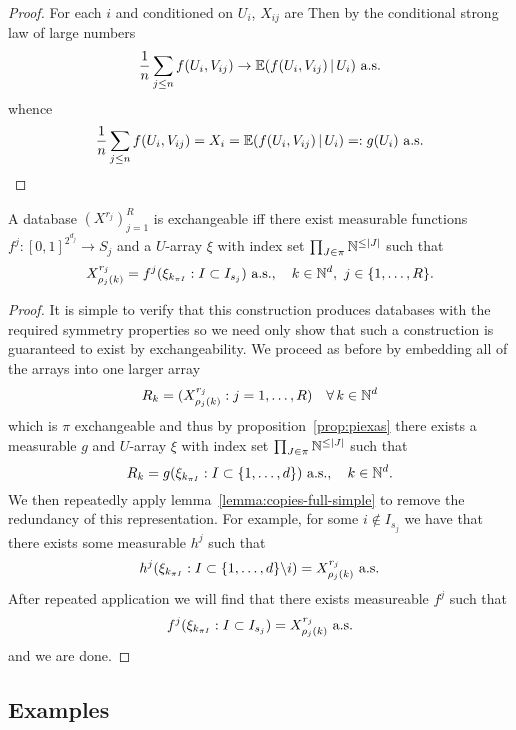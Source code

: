 \begin{proof}
  For each $i$ and conditioned on $U_i$, ${X}_{ij}$ are \iid
  Then by the conditional strong law of large numbers
  \[
    \frac{1}{n}\sum_{j \leq n} f(U_i, V_{ij}) \to \mathbb{E}(f(U_i, V_{ij})\,|\, U_i) \,\, \textrm{a.s.}
  \]
  whence
  \[
    \frac{1}{n}\sum_{j \leq n} f(U_i, V_{ij}) = X_i = \mathbb{E}(f(U_i, V_{ij})\,|\, U_i) =: g(U_i) \,\, \textrm{a.s.}
  \]
\end{proof}

\begin{thm}
  \label{thm:as-database}
  A database $(X^{r_j})_{j=1}^R$ is exchangeable iff there exist measurable functions $f^j : [0,1]^{2^{d_j}} \to S_j$ and a $U$-array $\xi$ with index set $\prod_{J\in\pi} \mathbb{N}^{\leq |J|}$ such that
  \begin{equation}
    X_{\rho_j(k)}^{r_j} = f^j(\xi_{k_{\pi I}} : I \subset I_{s_j}) \ \as, \quad k \in \Nats^d, \ j \in \{1,\ldots,R\}.
  \end{equation}
\end{thm}

\begin{proof}
  It is simple to verify that this construction produces databases with the required symmetry properties so we need only show that such a construction is guaranteed to exist by exchangeability.
  We proceed as before by embedding all of the arrays into one larger array
  \[
    R_{k} = (X^{r_j}_{\rho_j(k)} : j = 1,\dots,R) \quad \forall \, k \in \mathbb{N}^d
  \]
  which is $\pi$ exchangeable and thus by proposition~\ref{prop:piexas} there exists a measurable $g$ and $U$-array $\xi$ with index set $\prod_{J\in\pi} \mathbb{N}^{\leq |J|}$ such that
  \[
    R_{k} = g(\xi_{k_{\pi I}} : I \subset \{1,\ldots,d\}) \ \textrm{a.s.}, \quad k \in \mathbb{N}^d.
  \]
  We then repeatedly apply lemma~\ref{lemma:copies-full-simple} to remove the redundancy of this representation.
  For example, for some $i \notin I_{s_j}$ we have that there exists some measurable $h^j$ such that
  \[
    h^j(\xi_{k_{\pi I}} : I \subset \{1,\ldots,d\} \backslash i) = X^{r_j}_{\rho_j(k)} \ \textrm{a.s.}
  \]
  After repeated application we will find that there exists measureable $f^j$ such that
  \[
    f^j(\xi_{k_{\pi I}} : I \subset I_{s_j}) = X^{r_j}_{\rho_j(k)} \ \textrm{a.s.}
  \]
  and we are done.
\end{proof}

\subsection{Examples}

